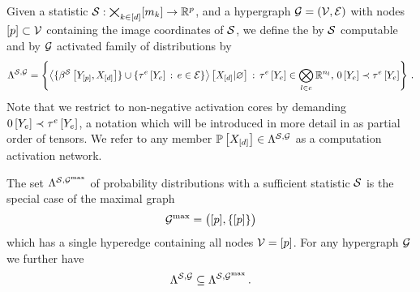 \begin{definition}
    \label{def:realizableStatDistributions}
    Given a statistic $\mathcal{S} : \bigtimes_{k\in[d]}[m_{k}] \rightarrow \mathbb{R}^{p}$, and a hypergraph $\mathcal{G}=(\mathcal{V},\mathcal{E})$ with nodes $[p]\subset\mathcal{V}$ containing the image coordinates of $\mathcal{S}$, we define the by $\mathcal{S}$ computable and by $\mathcal{G}$ activated family of distributions by
    \begin{align*}
        \Lambda^{\mathcal{S},\mathcal{G}}
        = \left\{ \left\langle \{\beta^{\mathcal{S}}\left[Y_{[p]},X_{[d]}\right]\} \cup \{\tau^{e}\left[Y_{e}\right] \,:\, e\in\mathcal{E} \}\right\rangle \left[ X_{[d]} | \varnothing \right]  \,:\, \tau^{e}\left[Y_{e}\right]\in\bigotimes_{l\in e}\mathbb{R}^{n_{l}},\,0\left[Y_{e}\right]\prec\tau^{e}\left[Y_{e}\right] \right\} \, .
    \end{align*}
    Note that we restrict to non-negative activation cores by demanding $0\left[Y_{e}\right]\prec\tau^{e}\left[Y_{e}\right]$, a notation which will be introduced in more detail in  as partial order of tensors.
    We refer to any member $\mathbb{P}\left[X_{[d]}\right]\in\Lambda^{\mathcal{S},\mathcal{G}}$ as a computation activation network.
\end{definition}

The set $\Lambda^{\mathcal{S},\mathcal{G}^{\mathrm{max}}}$ of probability distributions with a sufficient statistic $\mathcal{S}$ is the special case of the maximal graph
\begin{align*}
    \mathcal{G}^{\mathrm{max}} = \big([p],\{[p]\}\big)
\end{align*}
which has a single hyperedge containing all nodes $\mathcal{V}=[p]$.
For any hypergraph $\mathcal{G}$ we further have
\begin{align*}
    \Lambda^{\mathcal{S},\mathcal{G}} \subseteq \Lambda^{\mathcal{S},\mathcal{G}^{\mathrm{max}}} \, .
\end{align*}

